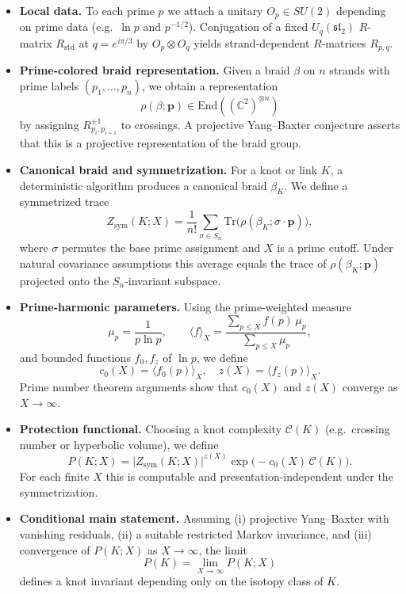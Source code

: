 \documentclass[11pt]{article}
\begin{document}
\begin{itemize}[leftmargin=1.5em]
  \item \textbf{Local data.}
  To each prime $p$ we attach a unitary $O_p\in SU(2)$ depending on prime data (e.g.\ $\ln p$ and $p^{-1/2}$).
  Conjugation of a fixed $U_q(\mathfrak{sl}_2)$ $R$-matrix $R_{\mathrm{std}}$ at $q=e^{i\pi/3}$ by $O_p\otimes O_q$ yields strand-dependent $R$-matrices $R_{p,q}$.%
  \item \textbf{Prime-colored braid representation.}
  Given a braid $\beta$ on $n$ strands with prime labels $(p_1,\dots,p_n)$, we obtain a representation
  \[
    \rho(\beta;\mathbf p)\in\mathrm{End}((\mathbb C^2)^{\otimes n})
  \]
  by assigning $R_{p_i,p_{i+1}}^{\pm1}$ to crossings.
  A projective Yang--Baxter conjecture asserts that this is a projective representation of the braid group.
  \item \textbf{Canonical braid and symmetrization.}
  For a knot or link $K$, a deterministic algorithm produces a canonical braid $\beta_K$.
  We define a symmetrized trace
  \[
    Z_{\mathrm{sym}}(K;X)
    = \frac{1}{n!}\sum_{\sigma\in S_n}
      \mathrm{Tr}\bigl(\rho(\beta_K;\sigma\cdot \mathbf p)\bigr),
  \]
  where $\sigma$ permutes the base prime assignment and $X$ is a prime cutoff.
  Under natural covariance assumptions this average equals the trace of $\rho(\beta_K;\mathbf p)$ projected onto the $S_n$-invariant subspace.
  \item \textbf{Prime-harmonic parameters.}
  Using the prime-weighted measure
  \[
    \mu_p = \frac{1}{p\ln p}, \qquad
    \langle f\rangle_X = \frac{\sum_{p\le X} f(p)\,\mu_p}{\sum_{p\le X}\mu_p},
  \]
  and bounded functions $f_0,f_z$ of $\ln p$, we define
  \[
    c_0(X) = \langle f_0(p)\rangle_X,
    \quad
    z(X)   = \langle f_z(p)\rangle_X.
  \]
  Prime number theorem arguments show that $c_0(X)$ and $z(X)$ converge as $X\to\infty$.
  \item \textbf{Protection functional.}
  Choosing a knot complexity $\mathcal C(K)$ (e.g.\ crossing number or hyperbolic volume), we define
  \[
    P(K;X) = \big|Z_{\mathrm{sym}}(K;X)\big|^{z(X)}\exp\big(-c_0(X)\,\mathcal C(K)\big).
  \]
  For each finite $X$ this is computable and presentation-independent under the symmetrization.
  \item \textbf{Conditional main statement.}
  Assuming (i) projective Yang--Baxter with vanishing residuals, (ii) a suitable restricted Markov invariance, and (iii) convergence of $P(K;X)$ as $X\to\infty$, the limit
  \[
    P(K) = \lim_{X\to\infty}P(K;X)
  \]
  defines a knot invariant depending only on the isotopy class of $K$.
\end{itemize}
\end{document}
